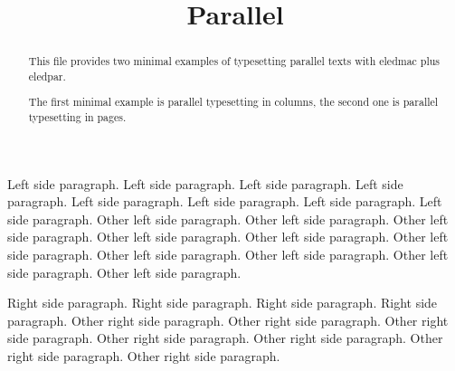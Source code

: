 \documentclass{article}
\begin{document}
\date{}
\title{Parallel}
\maketitle

\begin{abstract}
This file provides two minimal examples of typesetting parallel texts with eledmac plus eledpar. 

The first minimal example is parallel typesetting in columns, the second one is parallel typesetting in pages.
\end{abstract}


\begin{pairs}
    \begin{Leftside}
        \beginnumbering
            \pstart
                Left side paragraph. Left side paragraph. Left side paragraph. Left side paragraph. Left side paragraph. Left side paragraph. Left side paragraph. Left side paragraph.
            \pend
            \pstart
                Other left side paragraph.  Other left side paragraph.  Other left side paragraph.  Other left side paragraph.  Other left side paragraph.  Other left side paragraph.  Other left side paragraph.  Other left side paragraph.  Other left side paragraph.  Other left side paragraph.
            \pend
        \endnumbering
    \end{Leftside}
    \begin{Rightside}
        \beginnumbering
            \pstart
                Right side paragraph. Right side paragraph. Right side paragraph. Right side paragraph.
            \pend
            \pstart
                Other right side paragraph. Other right side paragraph. Other right side paragraph. Other right side paragraph. Other right side paragraph. Other right side paragraph. Other right side paragraph.
            \pend
        \endnumbering
    \end{Rightside}
\Columns
\end{pairs} 
\end{document}

